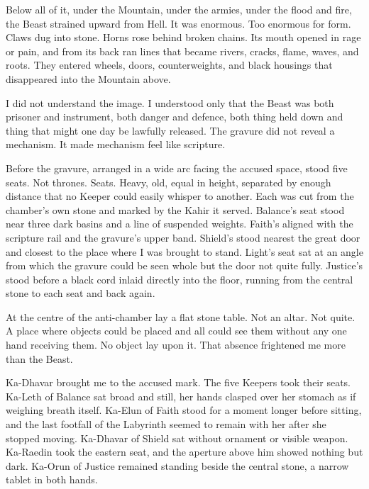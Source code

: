 Below all of it, under the Mountain, under the armies, under the flood and fire, the Beast strained upward from Hell. It was enormous. Too enormous for form. Claws dug into stone. Horns rose behind broken chains. Its mouth opened in rage or pain, and from its back ran lines that became rivers, cracks, flame, waves, and roots. They entered wheels, doors, counterweights, and black housings that disappeared into the Mountain above.\par

I did not understand the image. I understood only that the Beast was both prisoner and instrument, both danger and defence, both thing held down and thing that might one day be lawfully released. The gravure did not reveal a mechanism. It made mechanism feel like scripture.\par

Before the gravure, arranged in a wide arc facing the accused space, stood five seats. Not thrones. Seats. Heavy, old, equal in height, separated by enough distance that no Keeper could easily whisper to another. Each was cut from the chamber's own stone and marked by the Kahir it served. Balance's seat stood near three dark basins and a line of suspended weights. Faith's aligned with the scripture rail and the gravure's upper band. Shield's stood nearest the great door and closest to the place where I was brought to stand. Light's seat sat at an angle from which the gravure could be seen whole but the door not quite fully. Justice's stood before a black cord inlaid directly into the floor, running from the central stone to each seat and back again.\par

At the centre of the anti-chamber lay a flat stone table. Not an altar. Not quite. A place where objects could be placed and all could see them without any one hand receiving them. No object lay upon it. That absence frightened me more than the Beast.\par

Ka-Dhavar brought me to the accused mark. The five Keepers took their seats. Ka-Leth of Balance sat broad and still, her hands clasped over her stomach as if weighing breath itself. Ka-Elun of Faith stood for a moment longer before sitting, and the last footfall of the Labyrinth seemed to remain with her after she stopped moving. Ka-Dhavar of Shield sat without ornament or visible weapon. Ka-Raedin took the eastern seat, and the aperture above him showed nothing but dark. Ka-Orun of Justice remained standing beside the central stone, a narrow tablet in both hands.\par

